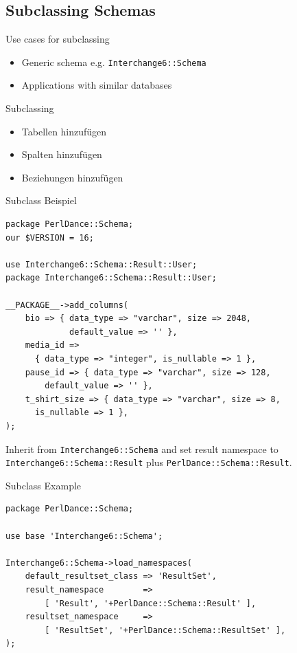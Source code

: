 \subsection{Subclassing Schemas}

\begin{frame}[fragile]{Use cases for subclassing}
\begin{itemize}
\item Generic schema e.g. \verb|Interchange6::Schema|
\item Applications with similar databases
\end{itemize}
\end{frame}

\begin{frame}{Subclassing}
\begin{itemize}
\item Tabellen hinzufügen
\item Spalten hinzufügen
\item Beziehungen hinzufügen
\end{itemize}
\end{frame}

\begin{frame}[fragile]{Subclass Beispiel}
\begin{lstlisting}
package PerlDance::Schema;
our $VERSION = 16;

use Interchange6::Schema::Result::User;
package Interchange6::Schema::Result::User;

__PACKAGE__->add_columns(
    bio => { data_type => "varchar", size => 2048, 
             default_value => '' },
    media_id =>
      { data_type => "integer", is_nullable => 1 },
    pause_id => { data_type => "varchar", size => 128, 
        default_value => '' },
    t_shirt_size => { data_type => "varchar", size => 8, 
      is_nullable => 1 },
);
\end{lstlisting}
\end{frame}

Inherit from \verb|Interchange6::Schema| and set result namespace to 
\verb|Interchange6::Schema::Result| plus \verb|PerlDance::Schema::Result|.

\begin{frame}[fragile]{Subclass Example}
\begin{lstlisting}
package PerlDance::Schema;

use base 'Interchange6::Schema';

Interchange6::Schema->load_namespaces(
    default_resultset_class => 'ResultSet',
    result_namespace        =>
        [ 'Result', '+PerlDance::Schema::Result' ],
    resultset_namespace     =>
        [ 'ResultSet', '+PerlDance::Schema::ResultSet' ],
);
\end{lstlisting}
\end{frame}


